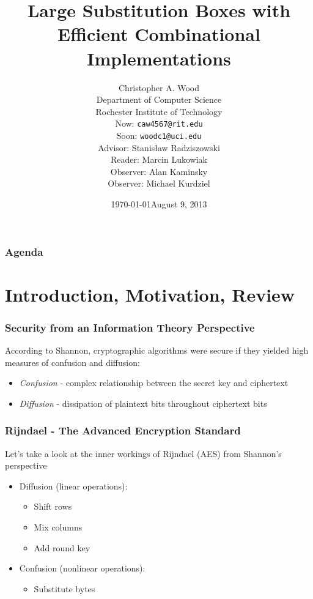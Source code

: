 \documentclass[handout,10pt]{beamer}
\title[Large Substitution Boxes with Efficient Combinational Implementations]{Large Substitution Boxes with Efficient Combinational Implementations}
\institute[RIT]{}
\date{\today}
\author[Christopher A. Wood]{Christopher A. Wood \\ Department of Computer Science \\ Rochester Institute of Technology \\ \vspace{1em} {\scriptsize Now: {\tt caw4567@rit.edu} \\ Soon: {\tt woodc1@uci.edu}} \\ \vspace{2em}
{\scriptsize Advisor: Stanis{\l}aw Radziszowski \\ Reader: Marcin Lukowiak \\ Observer: Alan Kaminsky \\ Observer: Michael Kurdziel}
}
\date{August 9, 2013}
\begin{document}
\begin{frame}
	\titlepage
\end{frame}

\begin{frame}
	\frametitle{Agenda}
	\tableofcontents
\end{frame}


\section{Introduction, Motivation, Review}
\begin{frame}
	\frametitle{Security from an Information Theory Perspective}
	According to Shannon, cryptographic algorithms were secure if they yielded high measures of confusion and diffusion:
	\begin{itemize}
		\item \emph{Confusion} - complex relationship between the secret key and ciphertext
		\item \emph{Diffusion} - dissipation of plaintext bits throughout ciphertext bits
	\end{itemize}
\end{frame}

\begin{frame}
	\frametitle{Rijndael - The Advanced Encryption Standard}
	Let's take a look at the inner workings of Rijndael (AES) from Shannon's perspective
	\begin{itemize}
		\item Diffusion (linear operations):
		\begin{itemize}
			\item Shift rows
			\item Mix columns
			\item Add round key
		\end{itemize}
		\item Confusion (nonlinear operations):
		\begin{itemize}
			\item Substitute bytes
		\end{itemize}
	\end{itemize}
\end{frame}
\end{document}
